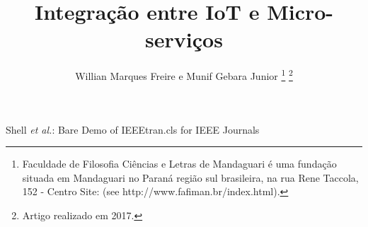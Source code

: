 \documentclass[journal]{IEEEtran}
\begin{document}
%
\title{Integração entre IoT e Micro-serviços}
%
%
%

\author{Willian Marques Freire e
        Munif Gebara Junior%
\thanks{Faculdade de Filosofia Ciências e Letras de Mandaguari é uma fundação
situada em Mandaguari no Paraná região sul brasileira,
na rua Rene Taccola, 152 - Centro Site: (see http://www.fafiman.br/index.html).}%
\thanks{Artigo realizado em 2017.}}

% 
%



%
{Shell \MakeLowercase{\textit{et al.}}: Bare Demo of IEEEtran.cls for IEEE Journals}
% 
\end{document}
